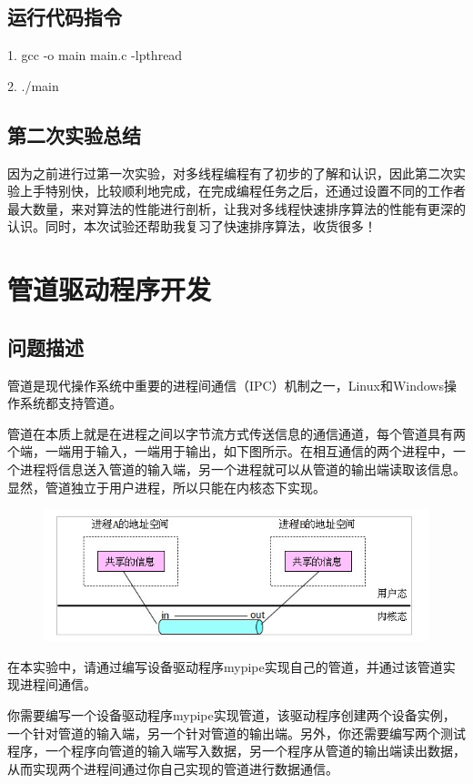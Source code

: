 \documentclass[UTF8]{ctexart}
\begin{document}
\subsection{运行代码指令}
1. gcc -o main main.c -lpthread\par
2. ./main

\subsection{第二次实验总结}
因为之前进行过第一次实验，对多线程编程有了初步的了解和认识，因此第二次实验上手特别快，比较顺利地完成，在完成编程任务之后，还通过设置不同的工作者最大数量，来对算法的性能进行剖析，让我对多线程快速排序算法的性能有更深的认识。同时，本次试验还帮助我复习了快速排序算法，收货很多！



\section{管道驱动程序开发}
\subsection{问题描述}
管道是现代操作系统中重要的进程间通信（IPC）机制之一，Linux和Windows操作系统都支持管道。\par
管道在本质上就是在进程之间以字节流方式传送信息的通信通道，每个管道具有两个端，一端用于输入，一端用于输出，如下图所示。在相互通信的两个进程中，一个进程将信息送入管道的输入端，另一个进程就可以从管道的输出端读取该信息。显然，管道独立于用户进程，所以只能在内核态下实现。\par

\begin{figure}[!h]
\centering
\includegraphics[scale = 0.7,bb=0 0 413 141]{5_1.jpg}
\label{img7}
\end{figure}

在本实验中，请通过编写设备驱动程序mypipe实现自己的管道，并通过该管道实现进程间通信。\par
你需要编写一个设备驱动程序mypipe实现管道，该驱动程序创建两个设备实例，一个针对管道的输入端，另一个针对管道的输出端。另外，你还需要编写两个测试程序，一个程序向管道的输入端写入数据，另一个程序从管道的输出端读出数据，从而实现两个进程间通过你自己实现的管道进行数据通信。\par
\end{document}

